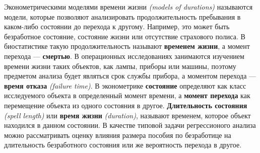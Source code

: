 \noindent
Эконометрическими моделями времени жизни \emph{(models of durations)} называются модели, которые позволяют анализировать продолжительность пребывания в каком-либо состоянии до перехода к другому. Например, это может быть безработное состояние, состояние жизни или отсутствие страхового полиса. В биостатистике такую продолжительность называют \textbf{временем жизни}, а момент перехода --- \textbf{смертью}. В операционных исследованиях занимаются изучением времени жизни таких объектов, как лампы, приборы или машины, поэтому предметом анализа будет являться срок службы прибора, а моментом перехода --- \textbf{время отказа} \emph{(failure time)}. В эконометрике \textbf{состояние} определяют как класс исследуемого объекта в определенный момент времени, а \textbf{момент перехода} как перемещение объекта из одного состояния в другое. \textbf{Длительность состояния} \emph{(spell length)} или \textbf{время жизни} \emph{(duration)}, называют временем, которое объект находился в данном состоянии. В качестве типовой задачи регрессионого анализа можно рассматривать оценку влияния размера пособия по безработице на длительность безработного состояния или же вероятность перехода в другое.

